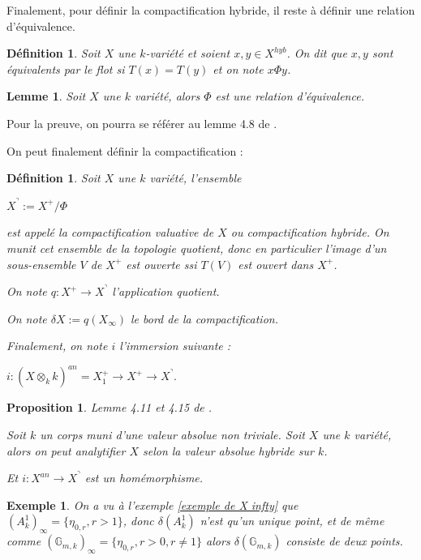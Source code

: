 \documentclass[11pt]{article}
\newtheorem{prop}[thm]{Proposition}
\newtheorem{lem}[thm]{Lemme}
\newtheorem{defi}[thm]{Définition}
\newtheorem{ex}[thm]{Exemple}
\begin{document}
Finalement, pour définir la compactification hybride, il reste à définir une relation d'équivalence.

\begin{defi}
Soit $X$ une $k$-variété et soient $x,y \in X^{hyb}$. On dit que $x,y$ sont équivalents par le flot si $T(x) = T(y)$ et on note $x \Phi y$.
\end{defi}

\begin{lem}
Soit $X$ une $k$ variété, alors $\Phi$ est une relation d'équivalence.
\end{lem}
Pour la preuve, on pourra se référer au lemme 4.8 de \cite{PoineauCompactificationHybride}.

On peut finalement définir la compactification :
\begin{defi}\label{immersion de Xan dans compactification}
Soit $X$ une $k$ variété, l'ensemble 
\begin{center}
$X^\urcorner := X^+/\Phi$
\end{center}
est appelé la compactification valuative de $X$ ou compactification hybride. On munit cet ensemble de la topologie quotient, donc en particulier l'image d'un sous-ensemble $V$ de $X^+$ est ouverte ssi $T(V)$ est ouvert dans $X^+$.

On note $q : X^+ \rightarrow X^\urcorner$ l'application quotient. 

On note $\delta X := q(X_\infty)$ le bord de la compactification.

Finalement, on note $i$ l'immersion suivante :
\begin{center}
$i : (X \otimes_k \hat{k})^{an} = X_1^+ \rightarrow X^+ \rightarrow X^\urcorner.$
\end{center} 
\end{defi}

\begin{prop}\label{prop section continue partie archi} Lemme 4.11 et 4.15 de \cite{PoineauCompactificationHybride}.

Soit $k$ un corps muni d'une valeur absolue non triviale. Soit $X$ une $k$ variété, alors on peut analytifier $X$ selon la valeur absolue hybride sur $k$.

Et $i : X^{an} \rightarrow X^\urcorner$ est un homémorphisme.
\end{prop}

\begin{ex}
On a vu à l'exemple \ref{exemple de X infty} que $(A^1_k)_\infty = \lbrace \eta_{0,r}, r>1\rbrace$, donc $\delta (A^1_k)$ n'est qu'un unique point, et de même comme $(\mathbb{G}_{m,k})_\infty = \lbrace \eta_{0,r}, r>0, r\neq 1\rbrace$ alors $\delta (\mathbb{G}_{m,k})$ consiste de deux points. 
\end{ex}
\end{document}
